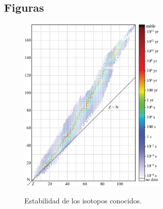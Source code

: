 \documentclass[10pt,twocolumn,titlepage]{article}
\begin{document}
\subsection*{Figuras}
\begin{figure}[htb!]
\centering
\includegraphics[width=7cm]{fig/isotopos.eps}
\label{isotopos}
\caption{Estabilidad de los isotopos conocidos.}
\end{figure}
\end{document}
